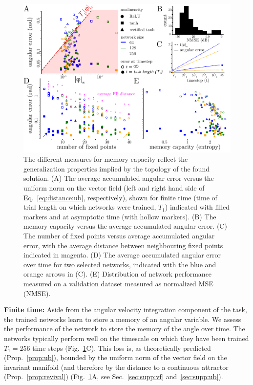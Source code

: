 \documentclass{article} %
\newcommand{\ptitle}[1]{\textbf{#1:}\xspace}
\newcounter{ct}
\theoremstyle{definition}
\theoremstyle{remark}
\begin{document}
\begin{figure}[tbhp]
  \centering
  \includegraphics[width=\textwidth]{angular_losses2}
  \caption{The different measures for memory capacity reflect the generalization properties implied by the topology of the found solution.
  (A) The average accumulated angular error versus the uniform norm on the vector field (left and right hand side of Eq.~\ref{eq:distance:ub}, respectively), shown for finite time (time of trial length on which networks were trained, \(T_1\)) indicated with filled markers and at asymptotic time (with hollow markers).
  (B) The memory capacity versus the average accumulated angular error.
  (C) The number of fixed points versus average accumulated angular error, with the average distance between neighbouring fixed points indicated in magenta.
  (D) The average accumulated angular error over time for two selected networks, indicated with the blue and orange arrows in (C).
  (E) Distribution of network performance measured on a validation dataset measured as normalized MSE (NMSE).
  }\label{fig:angular_loss}
\end{figure}


\ptitle{Finite time}
Aside from the angular velocity integration component of the task, the trained networks learn to store a memory of an angular variable.
We assess the performance of the network to store the memory of the angle over time.
The networks typically perform well on the timescale on which they have been trained \(T_1=256\) time steps (Fig.~\ref{fig:angular_loss}C).
This loss is, as theoretically predicted (Prop.~\ref{prop:ub}), bounded by the uniform norm of the vector field on the invariant manifold (and therefore by the distance to a continuous attractor (Prop.~\ref{prop:revival}) (Fig.~\ref{fig:angular_loss}A,  see Sec.~\ref{sec:supp:vf} and~\ref{sec:supp:ub}).
\end{document}
